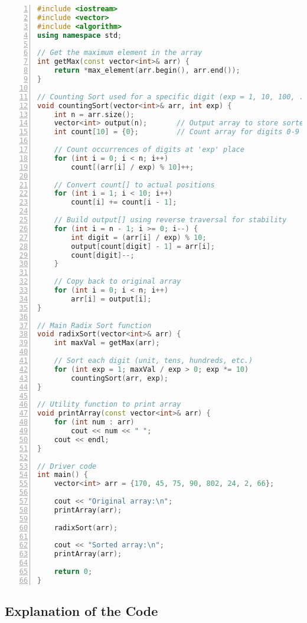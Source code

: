 \documentclass[14pt]{extarticle}
\begin{document}
\begin{lstlisting}[language=C++, caption=Radix Sort in C++, numbers=left]
#include <iostream>
#include <vector>
#include <algorithm>
using namespace std;

// Get the maximum element in the array
int getMax(const vector<int>& arr) {
    return *max_element(arr.begin(), arr.end());
}

// Counting Sort used for a specific digit (exp = 1, 10, 100, ...)
void countingSort(vector<int>& arr, int exp) {
    int n = arr.size();
    vector<int> output(n);       // Output array to store sorted values
    int count[10] = {0};         // Count array for digits 0-9

    // Count occurrences of digits at 'exp' place
    for (int i = 0; i < n; i++)
        count[(arr[i] / exp) % 10]++;

    // Convert count[] to actual positions
    for (int i = 1; i < 10; i++)
        count[i] += count[i - 1];

    // Build output[] using reverse traversal for stability
    for (int i = n - 1; i >= 0; i--) {
        int digit = (arr[i] / exp) % 10;
        output[count[digit] - 1] = arr[i];
        count[digit]--;
    }

    // Copy back to original array
    for (int i = 0; i < n; i++)
        arr[i] = output[i];
}

// Main Radix Sort function
void radixSort(vector<int>& arr) {
    int maxVal = getMax(arr);

    // Sort each digit (unit, tens, hundreds, etc.)
    for (int exp = 1; maxVal / exp > 0; exp *= 10)
        countingSort(arr, exp);
}

// Utility function to print array
void printArray(const vector<int>& arr) {
    for (int num : arr)
        cout << num << " ";
    cout << endl;
}

// Driver code
int main() {
    vector<int> arr = {170, 45, 75, 90, 802, 24, 2, 66};

    cout << "Original array:\n";
    printArray(arr);

    radixSort(arr);

    cout << "Sorted array:\n";
    printArray(arr);

    return 0;
}
\end{lstlisting}

\subsection*{Explanation of the Code}
\end{document}
